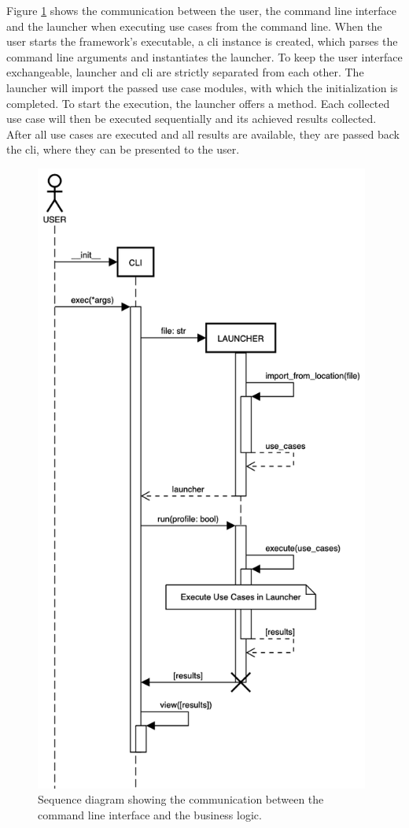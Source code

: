 Figure \ref{fig:application:design:cli} shows the communication between the
user, the command line interface and the launcher when executing use cases from
the command line.  When the user starts the framework's executable, a \gls{cli}
instance is created, which parses the command line arguments and instantiates
the launcher. To keep the user interface exchangeable, launcher and \gls{cli}
are strictly separated from each other. The launcher will import the passed use
case modules, with which the initialization is completed. To start the
execution, the launcher offers a  method. Each
collected use case will then be executed sequentially and its achieved results
collected. After all use cases are executed and all results are available, they
are passed back the \gls{cli}, where they can be presented to the user.

\begin{figure}[h]
    \centering
    \includegraphics[width=11cm]{resources/img/sequence/cli}
    \caption{
        Sequence diagram showing the communication between the command line
        interface and the business logic.
    }
    \label{fig:application:design:cli}
\end{figure}


